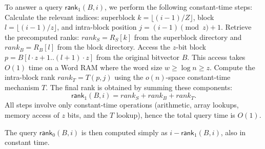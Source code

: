 To answer a query $\textsf{rank}_1(B, i)$, we perform the following constant-time steps:
Calculate the relevant indices: superblock $k = \lfloor (i-1)/Z \rfloor$, block $l = \lfloor (i-1)/z \rfloor$, and intra-block position $j = (i-1) \pmod z + 1$.
Retrieve the precomputed ranks: $rank_S = R_S[k]$ from the superblock directory and $rank_B = R_B[l]$ from the block directory.
Access the $z$-bit block $p = B[l \cdot z + 1 .. (l+1) \cdot z]$ from the original bitvector $B$. This access takes $O(1)$ time on a Word RAM where the word size $w \ge \log n \ge z$.
Compute the intra-block rank $rank_T = T(p, j)$ using the $o(n)$-space constant-time mechanism $T$.
The final rank is obtained by summing these components:
\[ \textsf{rank}_1(B, i) = rank_S + rank_B + rank_T. \]
All steps involve only constant-time operations (arithmetic, array lookups, memory access of $z$ bits, and the $T$ lookup), hence the total query time is $O(1)$.

The query $\textsf{rank}_0(B, i)$ is then computed simply as $i - \textsf{rank}_1(B, i)$, also in constant time.





